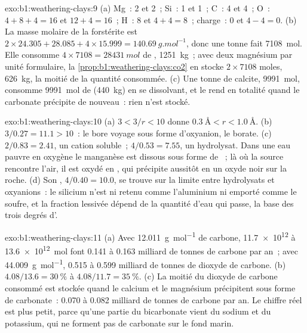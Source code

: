 \begin{solution}{exo:b1:weathering-clays:9}
(a) Mg~: 2 et 2~; Si~: 1 et 1~; C~: 4 et 4~; O~: $4 + 8 + 4 = 16$ et $12 + 4 =
16$~; H~: 8 et $4 + 4 = 8$~; charge~: 0 et $4 - 4 = 0$. (b) La masse molaire de
la forstérite est $2\times24.305 + 28.085 + 4\times15.999 =
\qty{140.69}{g.mol^{-1}}$, donc une tonne fait \qty{7108}{mol}. Elle consomme
$4\times7108 = \qty{28431}{mol}$ de , \qty{1251}{kg}~; avec deux
magnésium par unité formulaire, la \cref{prop:b1:weathering-clays:co2} en stocke
$2\times7108$ moles, \qty{626}{kg}, la moitié de la quantité consommée. (c) Une tonne de
calcite, \qty{9991}{mol}, consomme \qty{9991}{mol} de  (\qty{440}{kg})
en se dissolvant, et le rend en totalité quand le carbonate précipite de nouveau~:
rien n'est stocké.
\end{solution}

\begin{solution}{exo:b1:weathering-clays:10}
(a) $3 < 3/r < 10$ donne $\qty{0.3}{\angstrom} < r < \qty{1.0}{\angstrom}$.
(b) $3/0.27 = 11.1 > 10$~: le bore voyage sous forme d'oxyanion, le borate. (c) $2/0.83 =
2.41$, un cation soluble~; $4/0.53 = 7.55$, un hydrolysat. Dans une eau pauvre en
oxygène le manganèse est dissous sous forme de ~; là où la source rencontre l'air,
il est oxydé en , qui précipite aussitôt en un oxyde noir sur
la roche. (d) Son , $4/0.40 = 10.0$, se trouve sur la limite
entre hydrolysats et oxyanions~: le silicium n'est ni retenu comme l'aluminium ni
emporté comme le soufre, et la fraction lessivée dépend de la quantité d'eau qui
passe, la base des trois degrés d'.
\end{solution}

\begin{solution}{exo:b1:weathering-clays:11}
(a) Avec \qty{12.011}{g.mol^{-1}} de carbone, \num{11.7e12} à
\qty{13.6e12}{mol} font 0.141 à 0.163 milliard de tonnes de carbone par an~; avec
\qty{44.009}{g.mol^{-1}}, 0.515 à 0.599 milliard de tonnes de dioxyde de carbone.
(b) $4.08/13.6 = \qty{30}{\percent}$ à $4.08/11.7 = \qty{35}{\percent}$.
(c) La moitié du dioxyde de carbone consommé est stockée quand le calcium et le magnésium
précipitent sous forme de carbonate~: 0.070 à 0.082 milliard de tonnes de carbone par an. Le
chiffre réel est plus petit, parce qu'une partie du bicarbonate vient du sodium et du
potassium, qui ne forment pas de carbonate sur le fond marin.
\end{solution}

